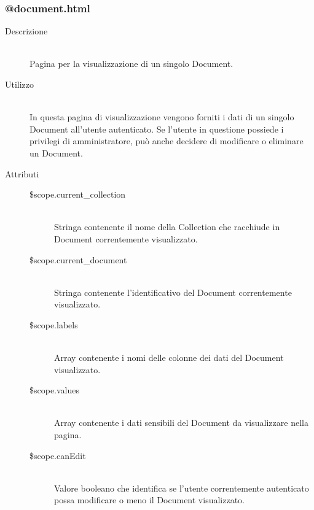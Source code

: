 \subsubsection{@document.html}
\begin{description}
	\item[Descrizione] \hfill \\
	Pagina per la visualizzazione di un singolo Document.
	\item[Utilizzo] \hfill \\
	In questa pagina di visualizzazione vengono forniti i dati di un singolo Document all'utente autenticato. Se l'utente in questione possiede i privilegi di amministratore, può anche decidere di modificare o eliminare un Document. 
	\item[Attributi] \hfill
	\begin{description}
		\item[\$scope.current\_collection] \hfill \\
		Stringa contenente il nome della Collection che racchiude in Document correntemente visualizzato.
		\item[\$scope.current\_document] \hfill \\
		Stringa contenente l'identificativo del Document correntemente visualizzato.
		\item[\$scope.labels] \hfill \\
		Array contenente i nomi delle colonne dei dati del Document visualizzato.
		\item[\$scope.values] \hfill \\
		Array contenente i dati sensibili del Document da visualizzare nella pagina.
		\item[\$scope.canEdit] \hfill \\
		Valore booleano che identifica se l'utente correntemente autenticato possa modificare o meno il Document visualizzato.
	\end{description}
\end{description}


